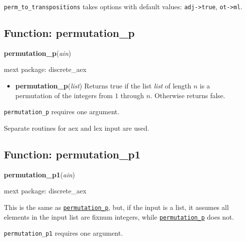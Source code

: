 \documentclass[]{article}
\begin{document}
\vspace{5 pt}

{\tt perm\_to\_transpositions} takes options with default values: {\tt adj->true}, {\tt ot->ml}.
\vspace{5 pt}


\subsection{Function: permutation\_p\label{sec:permutation_p}}
\hypertarget{permutation_p}{}
{\bf permutation\_p}({\it ain})


\noindent mext package: discrete\_aex



\vspace{5 pt}
\begin{itemize}
\item[] {\bf permutation\_p}({\it list})
  Returns true if the list {\it list} of length $n$ is a permutation of the integers from $1$ through $n$. Otherwise returns false. 

\end{itemize}
   {\tt permutation\_p} requires one argument.


\vspace{5 pt}


Separate routines for aex and lex input are used. 

\vspace{5 pt}


\subsection{Function: permutation\_p1\label{sec:permutation_p1}}
\hypertarget{permutation_p1}{}
{\bf permutation\_p1}({\it ain})


\noindent mext package: discrete\_aex



\vspace{5 pt}
This is the same as \hyperlink{permutation_p}{{\tt permutation\_p}}, but, if the input is a list, it assumes all elements in the input list are fixnum integers, while \hyperlink{permutation_p}{{\tt permutation\_p}} does not. 

\vspace{5 pt}

   {\tt permutation\_p1} requires one argument.
\end{document}
